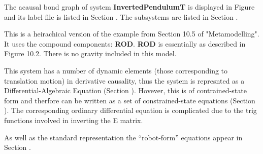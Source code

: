 
%

   The acausal bond graph of system \textbf{InvertedPendulumT} is
   displayed in Figure  and its label
   file is listed in Section .
   The subsystems are listed in Section .

This is a heirachical version of the example from Section 10.5 of
"Metamodelling".  It uses the compound components: {\bf ROD}.  {\bf
ROD} is essentially as described in Figure 10.2.
There is no gravity included in this model.

This system has a number of dynamic elements (those corresponding to translation
motion) in derivative causality, thus the system is represnted as a
Differential-Algebraic Equation (Section
). Hovever, this is of contrained-state form and
therfore can be written as a set of constrained-state equations (Section
). The corresponding ordinary differential
equation is complicated due to the trig functions involved in
inverting the E matrix.

As well as the standard representation the ``robot-form'' equations
appear in Section  . 

